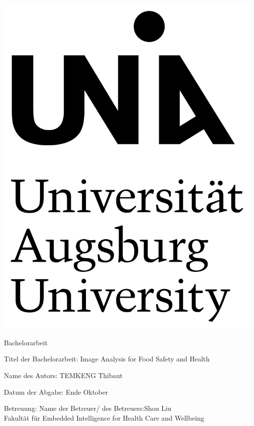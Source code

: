 \documentclass[12pt,a4paper]{scrartcl}
\numberwithin{equation}{section}
\begin{document}
  \pagestyle{empty}

  \begin{titlepage}

    \includegraphics[scale=0.05]{logo_uni} 
    \vspace*{2cm} 

 \begin{center} \large 
    
    Bachelorarbeit
    \vspace*{2cm}

    {\huge Titel der Bachelorarbeit: Image Analysis for Food Safety and Health}
    \vspace*{2.5cm}

    Name des Autors: TEMKENG Thibaut
    \vspace*{1.5cm}

    Datum der Abgabe: Ende Oktober
    \vspace*{4.5cm}


    Betreuung: Name der Betreuer/ des Betreuers:Shou Liu \\[1cm]
    Fakultät für Embedded Intelligence for Health Care and Wellbeing \\[1cm]

  \end{center}
\end{titlepage}
\end{document}
